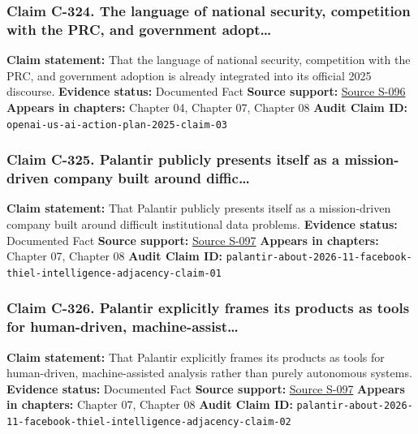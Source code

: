 \documentclass[
  american,
  11pt,
  letterpaper,
]{article}
\begin{document}
\subsubsection{Claim C-324. The language of national security,
competition with the PRC, and government
adopt\ldots{}}\label{claim-c-324-the-language-of-national-security-competition-with-the-prc-and-government-adopt}

\textbf{Claim statement:} That the language of national security,
competition with the PRC, and government adoption is already integrated
into its official 2025 discourse. \textbf{Evidence status:} Documented
Fact \textbf{Source support:}
\hyperref[source-s-096-openais-proposals-for-the-us-ai-action-plan]{Source
S-096} \textbf{Appears in chapters:} Chapter 04, Chapter 07, Chapter 08
\textbf{Audit Claim ID:} \texttt{openai-us-ai-action-plan-2025-claim-03}

\subsubsection{Claim C-325. Palantir publicly presents itself as a
mission-driven company built around
diffic\ldots{}}\label{claim-c-325-palantir-publicly-presents-itself-as-a-mission-driven-company-built-around-diffic}

\textbf{Claim statement:} That Palantir publicly presents itself as a
mission-driven company built around difficult institutional data
problems. \textbf{Evidence status:} Documented Fact \textbf{Source
support:} \hyperref[source-s-097-about-palantir]{Source S-097}
\textbf{Appears in chapters:} Chapter 07, Chapter 08 \textbf{Audit Claim
ID:}
\texttt{palantir-about-2026-11-facebook-thiel-intelligence-adjacency-claim-01}

\subsubsection{Claim C-326. Palantir explicitly frames its products as
tools for human-driven,
machine-assist\ldots{}}\label{claim-c-326-palantir-explicitly-frames-its-products-as-tools-for-human-driven-machine-assist}

\textbf{Claim statement:} That Palantir explicitly frames its products
as tools for human-driven, machine-assisted analysis rather than purely
autonomous systems. \textbf{Evidence status:} Documented Fact
\textbf{Source support:} \hyperref[source-s-097-about-palantir]{Source
S-097} \textbf{Appears in chapters:} Chapter 07, Chapter 08
\textbf{Audit Claim ID:}
\texttt{palantir-about-2026-11-facebook-thiel-intelligence-adjacency-claim-02}
\end{document}

